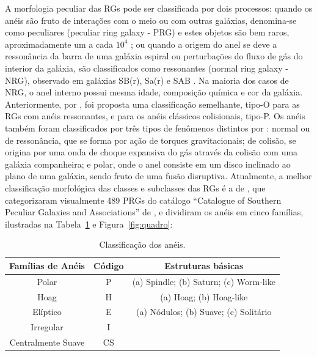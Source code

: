 A morfologia peculiar das RGs pode ser classificada por dois processos: quando os anéis são fruto de interações com o meio ou com outras galáxias, denomina-se como peculiares (peculiar ring galaxy - PRG) e estes objetos são bem raros, aproximadamente um a cada $10^\text{4}$ \cite{1987bin}; ou quando a origem do anel se deve a ressonância da barra de uma galáxia espiral ou perturbações do fluxo de gás do interior da galáxia, são classificados como ressonantes (normal ring galaxy - NRG), observado em galáxias SB(r), Sa(r) e SAB \cite{1998abans, 1995Buta}. Na maioria dos casos de NRG, o anel interno possui mesma idade, composição química e cor da galáxia. Anteriormente, por  , foi proposta uma classificação semelhante, tipo-O para as RGs com anéis ressonantes, e para os anéis clássicos colisionais, tipo-P. Os anéis também foram classificados por três tipos de fenômenos distintos por : normal ou de ressonância, que se forma por ação de torques gravitacionais; de colisão, se origina por uma onda de choque expansiva do gás através da colisão com uma galáxia companheira; e polar, onde o anel consiste em um disco inclinado ao plano de uma galáxia, sendo fruto de uma fusão disruptiva. Atualmente, a melhor classificação morfológica das classes e subclasses das RGs é a de , que categorizaram visualmente 489 PRGs do catálogo “Catalogue of Southern
Peculiar Galaxies and Associations” de , e dividiram os anéis em cinco famílias, ilustradas na Tabela~\ref{tab:minha_tabela} e Figura~\ref{fig:quadro}: 

\begin{table}[h]
  \centering
  \begin{tabular}{ccc}
    \toprule
    \textbf{Famílias de Anéis} & \textbf{Código} & \textbf{Estruturas básicas} \\
    \midrule
    Polar & P & (a) Spindle; (b) Saturn; (c) Worm-like \\
    Hoag & H & (a) Hoag; (b) Hoag-like \\
    Elíptico & E & (a) Nódulos; (b) Suave; (c) Solitário \\
    Irregular & I &  \\
    Centralmente Suave & CS &  \\
    \bottomrule
  \end{tabular}
  \caption{Classificação dos anéis\protect\footnotemark.}
  \label{tab:minha_tabela}
\end{table}

